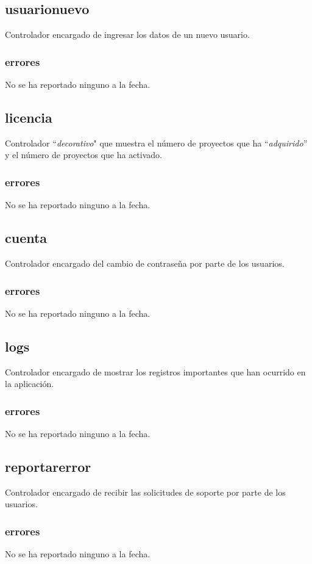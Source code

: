 \documentclass[10pt,a4paper]{book}
\begin{document}
	\subsection{usuarionuevo}
	Controlador encargado de ingresar los datos de un nuevo usuario.
	\subsubsection{errores}
	No se ha reportado ninguno a la fecha.

	\subsection{licencia}
	Controlador ``\textit{decorativo}" que muestra el número de proyectos que ha ``\textit{adquirido}'' y el número de proyectos que ha activado.
	\subsubsection{errores}
	No se ha reportado ninguno a la fecha.

	\subsection{cuenta}
	Controlador encargado del cambio de contraseña por parte de los usuarios.
	\subsubsection{errores}
	No se ha reportado ninguno a la fecha.

	\subsection{logs}
	Controlador encargado de mostrar los registros importantes que han ocurrido en la aplicación.
	\subsubsection{errores}
	No se ha reportado ninguno a la fecha.

	\subsection{reportarerror}
	Controlador encargado de recibir las solicitudes de soporte por parte de los usuarios.
	\subsubsection{errores}
	No se ha reportado ninguno a la fecha.
\end{document}
